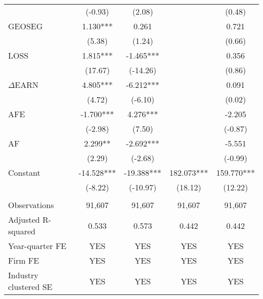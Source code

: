 \begin{table}[htbp]
\begin{tabular}{lcccc}
      & (-0.93) & (2.08) &   & (0.48) \\
    GEOSEG & 1.130*** & 0.261 &   & 0.721 \\
      & (5.38) & (1.24) &   & (0.66) \\
    LOSS & 1.815*** & -1.465*** &   & 0.356 \\
      & (17.67) & (-14.26) &   & (0.86) \\
    $\Delta$EARN & 4.805*** & -6.212*** &   & 0.091 \\
      & (4.72) & (-6.10) &   & (0.02) \\
    AFE & -1.700*** & 4.276*** &   & -2.205 \\
      & (-2.98) & (7.50) &   & (-0.87) \\
    AF & 2.299** & -2.692*** &   & -5.551 \\
      & (2.29) & (-2.68) &   & (-0.99) \\
    Constant & -14.528*** & -19.388*** & 182.073*** & 159.770*** \\
      & (-8.22) & (-10.97) & (18.12) & (12.22) \\
      &   &   &   &  \\
    Observations & 91,607 & 91,607 & 91,607 & 91,607 \\
    Adjusted R-squared & 0.533 & 0.573 & 0.442 & 0.442 \\
    Year-quarter FE & YES & YES & YES & YES \\
    Firm FE & YES & YES & YES & YES \\
    Industry clustered SE & YES & YES & YES & YES \\
    \bottomrule
    \bottomrule
    \end{tabular}%
\end{table}%
